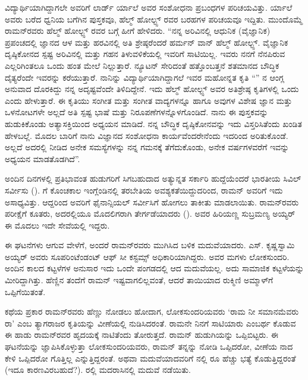 ವಿದ್ಯಾರ್ಥಿಯಾಗಿದ್ದಾಗಲೇ ಅವರಿಗೆ ಲಾರ್ಡ್ ರ್ಯಾಲೆ ಅವರ ಸಂಶೋಧನಾ ಪ್ರಬಂಧಗಳ ಪರಿಚಯವಿತ್ತು. ರ್ಯಾಲೆ ಅವರು ಬರೆದ ಧ್ವನಿಯ ಬಗೆಗಿನ ಪುಸ್ತಕವೂ, ಹೆಲ್ಮ್ ‍ಹೋಲ್ಟ್ಸ್ ರವರ ಬರಹಗಳ ಪರಿಚಯವೂ ಇದ್ದಿತು. ಮುಂದೊಮ್ಮೆ ರಾಮನ್‍ರವರು ಹೆಲ್ಮ್ ‍ಹೋಲ್ಟ್ಸ್ ರವರ ಬಗ್ಗೆ ಹೀಗೆ ಹೇಳಿದರು. “ನನ್ನ ಅರಿವಿನಲ್ಲಿ ಆಧುನಿಕ (ವೈಜ್ಞಾನಿಕ) ಪ್ರಪಂಚದಲ್ಲಿ ಜ್ಞಾನದ ಆಳ ಮತ್ತು ಹರವಿನಲ್ಲಿ ಅತಿ ಶ್ರೇಷ್ಠರೆಂದರೆ ಹರ್ಮನ್ ವಾನ್ ಹೆಲ್ಮ್ ‍ಹೋಲ್ಟ್ಸ್. ವೈಜ್ಞಾನಿಕ ದೃಷ್ಠಿಕೋನದ ಸ್ಪಷ್ಟ ಅರಿವಿನಲ್ಲಿ ಮತ್ತು ಗಹನ ತಿಳುವಳಿಕೆಯಲ್ಲಿ ಇವರಿಗೆ ಸಾಟಿಯಿಲ್ಲ. ಇವರು ನನಗೆ ನೆನಪಿರುವ ಎಲ್ಲರಿಗಿಂತಲೂ ಒಂದು ಹಂತ ಮೇಲೆ ನಿಲ್ಲುತ್ತಾರೆ. ನ್ಯೂಟನ್ ಸೇರಿದಂತೆ ಹತ್ತೊಂಬತ್ತನೆ ಶತಮಾನದ ಬೌದ್ಧಿಕ ದೈತ್ಯರೆಂದೇ ಇವರನ್ನು ಕರೆಯುತ್ತಾರೆ. ನಾನಿನ್ನು ವಿದ್ಯಾರ್ಥಿಯಾಗಿದ್ದಾಗಲೆ ಇವರ ಮಹೋನ್ನತ ಕೃತಿ “” ನ ಆಂಗ್ಲ ಅನುವಾದ ದೊರಕಿದ್ದು ನನ್ನ ಅದೃಷ್ಟವೆಂದೇ ತಿಳಿದಿದ್ದೇನೆ. ಇದು ಹೆಲ್ಮ್ ‍ಹೋಲ್ಟ್ಸ್ ಅವರ ಅತಿಶ್ರೇಷ್ಠ ಕೃತಿಗಳಲ್ಲಿ ಒಂದು ಎಂದು ಹೇಳುತ್ತಾರೆ. ಈ ಕೃತಿಯು ಸಂಗೀತ ಮತ್ತು ಸಂಗೀತ ವಾದ್ಯಗಳನ್ನೂ ಹಾಗೂ ಅವುಗಳ ವಿಶೇಷ ಜ್ಞಾನ ಮತ್ತು ಒಳನೋಟಗಳೇ ಅಲ್ಲದೆ ಅತಿ ಸ್ಪಷ್ಟ ಭಾಷೆ ಮತ್ತು ನಿರೂಪಣೆಗಳನ್ನೊಳಗೊಂಡಿದೆ. ನಾನು ಈ ಪುಸ್ತಕವನ್ನು ಹುಡುಕಿಕೊಂಡು ಅತ್ಯಾಸಕ್ತಿಯಿಂದ ಅಧ್ಯಯನ ಮಾಡಿದೆ. ನನ್ನ ಬೌದ್ಧಿಕ ದೃಷ್ಠಿಕೋನವನ್ನು ಇದು ವಿಸ್ತರಿಸಿತೆಂದು ಖಂಡಿತ ಹೇಳಬಲ್ಲೆ. ಮೊದಲ ಬಾರಿಗೆ ನಾನು ವಿಜ್ಞಾನದ ಸಂಶೋಧನಾ ಕಾರ್ಯವೆಂದರೇನೆಂದು ಇದರಿಂದ ಅರಿತುಕೊಂಡೆ. ಅಲ್ಲದೆ ಅದರಲ್ಲಿ ನೀಡಿದ ಅನೇಕ ಸಮಸ್ಯೆಗಳನ್ನು ನನ್ನ ಗಮನಕ್ಕೆ ತೆಗೆದುಕೊಂಡು, ಅನೇಕ ವರ್ಷಗಳವರೆಗೆ ಇವನ್ನು ಅಧ್ಯಯನ ಮಾಡತೊಡಗಿದೆ”.



ಅಂದಿನ ದಿನಗಳಲ್ಲಿ ಪ್ರತಿಭಾವಂತ ಹುಡುಗರಿಗೆ ಸಿಗಬಹುದಾದ ಅತ್ಯುನ್ನತ ಸರ್ಕಾರಿ ಹುದ್ದೆಯೆಂದರೆ ಭಾರತೀಯ ಸಿವಿಲ್ ಸರ್ವೀಸು ().  ಗೆ ಕೊಂಚಕಾಲ ಇಂಗ್ಲೆಂಡಿನಲ್ಲಿ ತರಬೇತಿಯ ಅವಶ್ಯಕತೆಯಿದ್ದುದರಿಂದ, ರಾಮನ್ ಅವರಿಗೆ ಇದು ಅಸಾಧ್ಯವಿತ್ತು. ಆದ್ದರಿಂದ ಅವರಿಗೆ ಫೈನಾನ್ಸಿಯಲ್ ಸರ್ವೀಸಿಗೆ  ಹೋಗಲು ತಾಕೀತು ಮಾಡಲಾಯಿತು. ರಾಮನ್‍ರವರು  ಪರೀಕ್ಷೆಗೆ ಕೂತರು, ಅದರಲ್ಲಿಯೂ ಮೊದಲಿಗರಾಗಿ ತೇರ್ಗಡೆಯಾದರು (). ಅವರ ಹಿರಿಯಣ್ಣ ಸುಬ್ರಮಣ್ಯ ಅಯ್ಯರ್ ಈ ಮೊದಲು ಇದೇ ಸೇವೆಯಲ್ಲಿ ಇದ್ದರು.

ಈ ಘಟನೆಗಳು ಆಗುವ ವೇಳೆಗೆ, ಅಂದರೆ ರಾಮನ್‍ರವರು  ಮುಗಿಸಿದ ಬಳಿಕ ಮದುವೆಯಾದರು. ಎಸ್. ಕೃಷ್ಣಸ್ವಾಮಿ ಅಯ್ಯರ್ ಅವರು ಸೂಪರಿಂಟೆಂಡಂಟ್ ಆಫ್ ಸೀ ಕಸ್ಟಮ್ಸ್ ಅಧಿಕಾರಿಯಾಗಿದ್ದರು. ಅವರ ಮಗಳು ಲೋಕಸುಂದರಿ. ಅಂದಿನ ಕಾಲದ ಕಟ್ಟಳೆಗಳ ಅನುಸಾರ ಇದು ಒಂದೇ ಪಂಗಡದಲ್ಲಿ ಆದ ಮದುವೆಯಲ್ಲ. ಅದು ಸಾಮಾಜಿಕ ಕಟ್ಟಳೆಯನ್ನು ಮೀರಿದ್ದಾಗಿತ್ತು. ಹೆಣ್ಣಿನ ತಂದೆಗೆ ರಾಮನ್ ಇಷ್ಟವಾಗಲಿಲ್ಲವಂತೆ, ಆದರೆ ತಾಯಿಯಾದ ರುಕ್ಮಿಣಿ ಅಮ್ಮಾಳ್‍ಗೆ ಒಪ್ಪಿಗೆಯಿತಂತೆ.

ಕಥೆಯ ಪ್ರಕಾರ ರಾಮನ್‍ರವರು ಹೆಣ್ಣು ನೋಡಲು ಹೋದಾಗ, ಲೋಕಸುಂದರಿಯವರು ‘ರಾಮ ನೀ ಸಮಾನಮೆವರು ರಾ’ ಎಂಬ ತ್ಯಾಗರಾಜರ ಕೃತಿಯನ್ನು ವೀಣೆಯಲ್ಲಿ ನುಡಿಸಿದರಂತೆ. ರಾಮನೇ ನಿನಗೆ ಸಾಟಿಯಾರು ಎಂಬರ್ಥ ಕೊಡುವ ಈ ಹಾಡು ರಾಮನ್‍ರವರ ಹೃದಯಕ್ಕೆ ನಾಟಿತೆಂದು ತೋರುತ್ತದೆ. ರಾಮನ್ ಹುಡುಗಿಯನ್ನು ಒಪ್ಪಿಬಿಟ್ಟರು. ಈ ಘಟನೆಯನ್ನು ಜ್ಞಾಪಿಸಿಕೊಳ್ಳುತ್ತಾ ಲೋಕಸುಂದರಿಯವರು, ರಾಮನ್ ತನ್ನನ್ನು ನೋಡಿ ಒಪ್ಪಿದರೋ, ವೀಣೆಯ ನಾದ ಕೇಳಿ ಒಪ್ಪಿದರೋ ಗೊತ್ತಿಲ್ಲ ಎನ್ನುತ್ತಿದ್ದರಂತೆ. ಅಥವಾ ಮದುವೆಯಾದವರಿಗೆ  ನಲ್ಲಿ ರೂ  ಹೆಚ್ಚು ಭತ್ಯೆ ಕೊಡುತ್ತಿದ್ದರಂತೆ (ಇದೂ ಕಾರಣವಿರಬಹುದೆ?). ರಲ್ಲಿ ಮದರಾಸಿನಲ್ಲಿ ಮದುವೆ ನಡೆಯಿತು.

